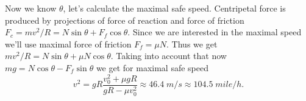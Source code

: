 \documentclass[12pt]{article}
\begin{document}
Now we know $\theta$, let's calculate the maximal safe speed. Centripetal force is produced
by projections of force of reaction and force of friction $F_c=mv^2/R=N\sin\theta +F_f\cos\theta$. Since
we are interested in the maximal speed we'll use maximal force of friction $F_f=\mu N$.
Thus we get $mv^2/R=N\sin\theta +\mu N\cos\theta$.  Taking into account that now
$mg=N \cos\theta-F_f \sin\theta $
we get  for maximal safe speed 
$$v^2=gR\frac{v_0^2 +\mu g R}{gR-\mu v_0^2}\approx 46.4\;m/s\approx 104.5\;mile/h.$$
 
\end{document}
